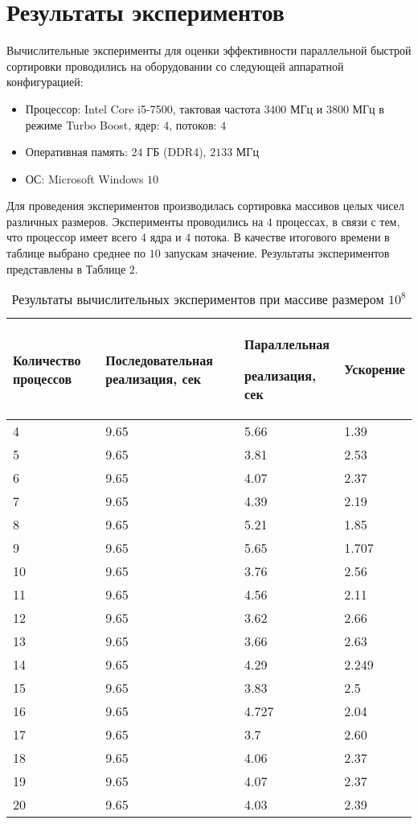 \documentclass{report}
\begin{document}
\section*{Результаты экспериментов}
Вычислительные эксперименты для оценки эффективности параллельной быстрой сортировки проводились на оборудовании со следующей аппаратной конфигурацией:
\begin{itemize}
\item Процессор: Intel Core i5-7500, тактовая частота $3400$ МГц и $3800$ МГц в режиме Turbo Boost, ядер: $4$, потоков: $4$
\item Оперативная память: $24$ ГБ (DDR4), $2133$ МГц
\item ОС: Microsoft Windows $10$
\end{itemize}
\par Для проведения экспериментов производилась сортировка массивов целых чисел различных размеров. Эксперименты проводились на $4$ процессах, в связи с тем, что процессор имеет всего $4$ ядра и $4$ потока. В качестве итогового времени в таблице выбрано среднее по $10$ запускам значение. Результаты экспериментов представлены в Таблице $2$.
\newpage
\begin{table}[h]
    \begin{tabular}{ | p{4cm} | p{4cm} | p{4cm} | p{4cm} | }
    \hline
    Количество процессов & Последовательная реализация, сек & Параллельная \par реализация, сек & Ускорение\\ \hline
    4    & 9.65  & 5.66  &1.39 \\ \hline
    5    & 9.65  & 3.81  &2.53 \\ \hline 
    6    & 9.65  & 4.07  &2.37 \\ \hline
    7    & 9.65  & 4.39  &2.19 \\ \hline
    8    & 9.65  & 5.21  &1.85 \\ \hline
    9    & 9.65  & 5.65  &1.707\\ \hline
    10   & 9.65  & 3.76  &2.56 \\ \hline
    11   & 9.65  & 4.56  &2.11 \\ \hline
    12   & 9.65  & 3.62  &2.66 \\ \hline
    13   & 9.65  & 3.66  &2.63 \\ \hline
    14   & 9.65  & 4.29  &2.249\\ \hline
    15   & 9.65  & 3.83  &2.5  \\ \hline
    16   & 9.65  & 4.727 &2.04 \\ \hline
    17   & 9.65  & 3.7   &2.60 \\ \hline
    18   & 9.65  & 4.06  &2.37 \\ \hline 
    19   & 9.65  & 4.07  &2.37 \\ \hline 
    20   & 9.65  & 4.03  &2.39 \\ \hline 
    \end{tabular}
    \caption{Результаты вычислительных экспериментов при массиве размером $10^8$}
\end{table}
\end{document}
